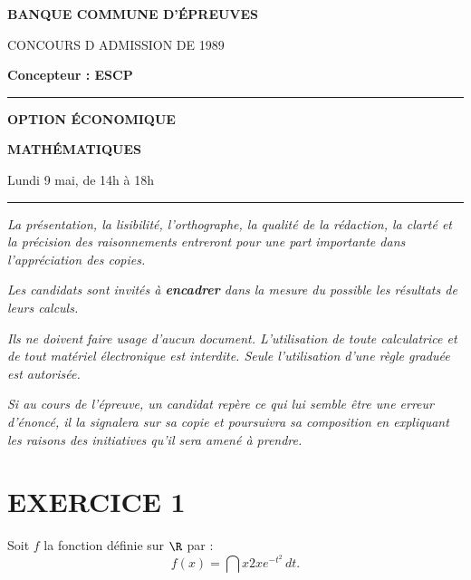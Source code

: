\documentclass[11pt]{article}%
\begin{document}

\begin{center}
{\LARG\E\textbf{BANQUE COMMUNE D'ÉPREUVES}}



{\large \textsc{CONCOURS D ADMISSION DE 1989}}



{\large \textbf{Concepteur : ESCP}}



\rule{2.39cm}{0.05cm}



{\Large \textbf{OPTION ÉCONOMIQUE}}



{\Large \textbf{MATHÉMATIQUES }}



{\Large Lundi 9 mai, de 14h à 18h}



\rule{2.39cm}{0.05cm}
\end{center}

\textit{La présentation, la lisibilité, l'orthographe, la qualité
de la rédaction, la clarté et la précision des raisonnements
entreront pour une part importante dans l'appréciation des copies.}

\textit{Les candidats sont invités à \textbf{encadrer} dans la mesure
du possible les résultats de leurs calculs.}

\textit{Ils ne doivent faire usage d'aucun document. L'utilisation de
toute
calculatrice et de tout matériel électronique est interdite. Seule
l'utilisation d'une règle graduée est autorisée.}

\textit{Si au cours de l'épreuve, un candidat repère ce qui lui semble
être une erreur d'énoncé, il la signalera sur sa copie et
poursuivra sa composition en expliquant les raisons des initiatives
qu'il sera
amené à prendre.}

\vspace*{3cm}

\section*{EXERCICE 1}

Soit $f$ la fonction définie sur $\R$ par : 
\[
f(x) = \dint{x}{2x}e^{-t^{2}}\,dt.
\]
\end{document}
